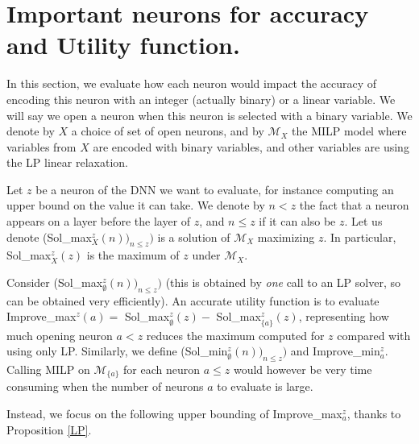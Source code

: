 \section{Important neurons for accuracy and Utility function.}

In this section, we evaluate how each neuron would impact the accuracy of encoding this neuron with an integer (actually binary) or a linear variable. We will say we open a neuron when this neuron is selected with a binary variable. We denote by $X$ a choice of set of open neurons, and by $\mathcal{M}_X$ the MILP model where variables from $X$ are encoded with binary variables, and other variables are using the LP linear relaxation.

Let $z$ be a neuron of the DNN we want to evaluate, for instance computing an upper bound on the value it can take. We denote by $n< z$ the fact that a neuron appears on a layer before the layer of $z$, and $n \leq z$ if it can also be $z$.
Let us denote (Sol\_max$_X^z(n))_{n \leq z})$ is a solution of $\mathcal{M}_X$ 
maximizing $z$. In particular, Sol\_max$_X^z(z)$ is the maximum of $z$ under $\mathcal{M}_X$.

Consider (Sol\_max$_\emptyset^z(n))_{n \leq z})$ (this is obtained by {\em one} call to an LP solver, so can be obtained very efficiently).
An accurate utility function is to evaluate 
Improve\_max$^z(a)=$ Sol\_max$_\emptyset^z(z) -$ Sol\_max$_{\{a\}}^z(z)$, 
representing how much opening neuron $a < z$ reduces the maximum computed for $z$
compared with using only LP. 
Similarly, we define (Sol\_min$_\emptyset^z(n))_{n \leq z})$ and 
Improve\_min$_a^z$. Calling MILP on $\mathcal{M}_{\{a\}}$ for each neuron $a \leq z$
would however be very time consuming when the number of neurons $a$ to evaluate is large.

Instead, we focus on the following upper bounding of Improve\_max$_a^z$, thanks to Proposition \ref{LP}.








